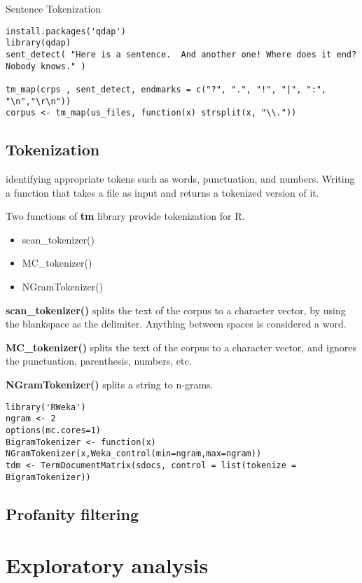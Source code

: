 \documentclass{article}
\begin{document}
Sentence Tokenization

\begin{lstlisting}
install.packages('qdap')
library(qdap)
sent_detect( "Here is a sentence.  And another one! Where does it end? Nobody knows." )

tm_map(crps , sent_detect, endmarks = c("?", ".", "!", "|", ":", "\n","\r\n"))
corpus <- tm_map(us_files, function(x) strsplit(x, "\\."))

\end{lstlisting}


\subsection{Tokenization}

identifying appropriate tokens such as words, punctuation, and numbers. Writing a function that takes a file as input and returns a tokenized version of it.

Two functions of \textbf{tm} library provide tokenization for R.

\begin{itemize}
\item scan\_tokenizer()
\item MC\_tokenizer()
\item NGramTokenizer()
\end{itemize}

\textbf{scan\_tokenizer()} splits the text of the corpus to a character vector, by using the blankspace as the delimiter. Anything between spaces is considered a word.

\textbf{MC\_tokenizer()} splits the text of the corpus to a character vector, and ignores the punctuation, parenthesis, numbers, etc.

\textbf{NGramTokenizer()} splits a string to n-grams.

\begin{lstlisting}
library('RWeka')
ngram <- 2
options(mc.cores=1)
BigramTokenizer <- function(x) NGramTokenizer(x,Weka_control(min=ngram,max=ngram))
tdm <- TermDocumentMatrix(sdocs, control = list(tokenize = BigramTokenizer))
\end{lstlisting}

\subsection{Profanity filtering}



\section{Exploratory analysis}
\end{document}
